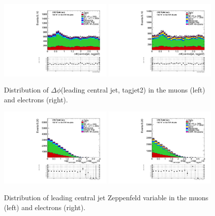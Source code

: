 \begin{figure}
\begin{center}
\includegraphics[width=0.49\textwidth]{figs/n-1_plots_mu/mu_EWK_W_2jets_centraljet_tagjet2_deltaphi_mjj_600_tagjet1_60_tagjet2_50_Zeppenfield_1point2_EWKW2jets.pdf}
\includegraphics[width=0.49\textwidth]{figs/n-1_plots_el/el_EWK_W_2jets_centraljet_tagjet2_deltaphi_mjj_600_tagjet1_60_tagjet2_50_Zeppenfield_1point2_met_30_WmT_30_EWKW2jets.pdf}
\end{center}
\caption{Distribution of $\Delta \phi$(leading central jet, tagjet2) in the muons (left) and electrons (right).}
\label{fig:centraljetdeltaphijettagjet2_20}
\end{figure}

\begin{figure}
\begin{center}
\includegraphics[width=0.49\textwidth]{figs/n-1_plots_mu/mu_EWK_W_2jets_centraljet_tagjet_Zeppenfield_mjj_600_tagjet1_60_tagjet2_50_Zeppenfield_1point2_EWKW2jets.pdf}
\includegraphics[width=0.49\textwidth]{figs/n-1_plots_el/el_EWK_W_2jets_centraljet_tagjet_Zeppenfield_mjj_600_tagjet1_60_tagjet2_50_Zeppenfield_1point2_met_30_WmT_30_EWKW2jets.pdf}
\end{center}
\caption{Distribution of leading central jet Zeppenfeld variable in the muons (left) and electrons (right).}
\label{fig:Zeppenfield_centraljetnumer}
\end{figure}
